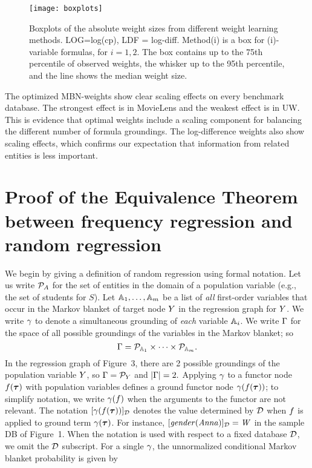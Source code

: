 \documentclass[twoside,leqno,twocolumn]{article}
\begin{document}
\begin{figure*}[htbp]
\begin{center}
\texttt{[image: boxplots]}
\caption{Boxplots of the absolute weight sizes from different weight learning methods. LOG=log(cp), LDF = log-diff. Method(i) is a box for (i)-variable formulas, for $i=1,2$. The box contains up to the 75th percentile of observed weights, the whisker up to the 95th percentile, and the line shows the median weight size.
\label{fig:boxplots}}
\end{center}
\end{figure*}

The optimized MBN-weights show clear scaling effects on every benchmark database. The strongest effect is in MovieLens and the weakest effect is in UW. This is evidence that optimal weights include a scaling component for balancing the different number of formula groundings. The log-difference weights also show scaling effects, which confirms our expectation that information from related entities is less important. 

\section{Proof of the Equivalence Theorem between frequency regression and random regression}

We begin by giving a definition of random regression using formal notation. Let us write $\mathcal{P}_{A}$ for the set of entities in the domain of a population variable (e.g., the set of students for $S$). Let $\mathbb{A}_{1},\ldots,\mathbb{A}_{m}$ be a list of {\em all} first-order variables that occur in the Markov blanket of target node $Y$ in the regression graph for $Y$. We write $\gamma$ to denote a simultaneous grounding of {\em each} variable $\mathbb{A}_{i}$. We write $\Gamma$ for the space of all possible groundings of the variables in the Markov blanket; so $$\Gamma = \mathcal{P}_{\mathbb{A}_{1}} \times \cdots \times \mathcal{P}_{\mathbb{A}_{m}}.$$ In the regression graph of Figure~3, there are 2 possible groundings of the population variable $Y$, so $\Gamma = \mathcal{P}_{Y}$ and $|\Gamma|=2.$
Applying $\gamma$ to a  functor node $f(\boldsymbol{\tau})$ with population variables defines a ground functor node $\gamma(f(\boldsymbol{\tau}))$; to simplify notation, we write $\gamma(f)$ when the arguments to  the functor are not relevant. The notation $[\gamma(f(\boldsymbol{\tau}))]_{\mathcal{D}}$ denotes the value determined by $\mathcal{D}$ when  $f$ is applied to ground term $\gamma(\boldsymbol{\tau})$.  For instance, $[\it{gender(Anna)}]_{\mathcal{D}} = W$ in the sample DB of Figure~1. When the notation is used with respect to a fixed database $\mathcal{D}$, we omit the $\mathcal{D}$ subscript. For a single $\gamma$, the unnormalized conditional Markov blanket probability is given by
\end{document}
